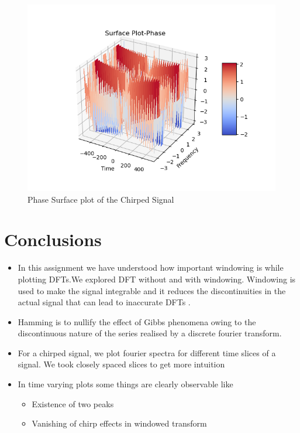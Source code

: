 \documentclass[12pt, a4paper]{report}
\begin{document}
 
    \begin{figure}[!tbh]
   	\centering
   	\includegraphics[scale=0.7]{Q6b.png}
	\caption{Phase Surface plot of the Chirped Signal}
 \end{figure} 
 
 \section*{Conclusions}
 \begin{itemize}
 \item In this assignment we have understood how important windowing is while plotting DFTs.We explored DFT without and with windowing. Windowing is used to make the signal integrable and it reduces the discontinuities in the actual signal that can lead to inaccurate DFTs .
 \item Hamming is to nullify the effect of Gibbs phenomena owing to the discontinuous nature of the series realised by a discrete fourier transform.
 \item  For a chirped signal, we plot fourier spectra for different time slices of a signal. We took closely spaced slices to get more intuition 
 \item In time varying plots some things are clearly observable like
\begin{itemize}
\item Existence of two peaks
\item Vanishing of chirp effects in windowed transform
\end{itemize}
 \end{itemize}  
\end{document}
